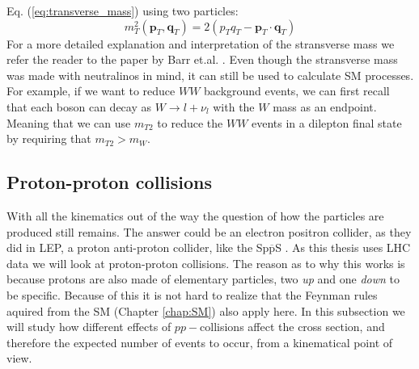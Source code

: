 \documentclass[12pt, a4paper]{book}
\begin{document}
Eq. (\ref{eq:transverse_mass}) using two particles:
$$
m_T^2 \left(\mathbf{p}_T, \mathbf{q}_T\right) = 2(p_T q_T - \mathbf{p}_T\cdot\mathbf{q}_T)
$$
For a more detailed explanation and interpretation of the stransverse mass we refer the reader to the paper by Barr et.al. \cite{Barr_2003}. Even though the stransverse mass was made with neutralinos in mind, it can still 
be used to calculate SM processes. For example, if we want to reduce $WW$ background events, we can first recall that each boson can decay as $W\rightarrow l+\nu_l$ with the $W$ mass as an endpoint. 
Meaning that we can use $m_{T2}$ to reduce the $WW$ events in a dilepton final state by requiring that $m_{T2} > m_W$.

\subsection{Proton-proton collisions}
With all the kinematics out of the way the question of how the particles are produced still remains. The answer could be an electron positron collider, as they did in LEP, a proton anti-proton collider, like the Sp$\overline{\mbox{p}}$S . As this thesis uses LHC data we will look at proton-proton collisions.
The reason as to why this works is because protons are also made of elementary particles, two \textit{up} and one \textit{down} to be specific.
Because of this it is not hard to realize that the Feynman rules aquired from the SM (Chapter \ref{chap:SM}) also apply here. In this subsection we will study how different effects of $pp-$collisions affect 
the cross section, and therefore the expected number of events to occur, from a kinematical point of view.
\end{document}
